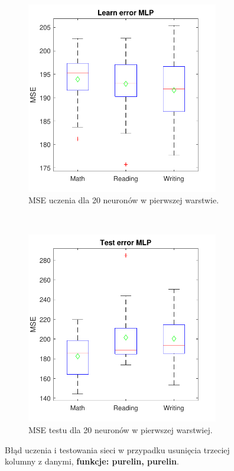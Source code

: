\documentclass[12pt]{article}
\begin{document}
\begin{figure}[H]
\centering
\begin{subfigure}[t]{0.48\textwidth} 
\centering
\includegraphics[height=3.3in]{purelin_purelin_20_without_3_learnBoxplot.pdf}
\caption{MSE uczenia dla  20 neuronów w pierwszej warstwie.}
\end{subfigure}
~~
\begin{subfigure}[t]{0.48\textwidth} 
\centering
\includegraphics[height=3.3in]{purelin_purelin_20_without_3_testBoxplot.pdf}
\caption{MSE testu dla  20  neuronów w pierwszej warstwiej.}
\end{subfigure}

\caption{Błąd uczenia i testowania sieci w przypadku usunięcia trzeciej  kolumny z danymi, \textbf{funkcje: purelin, purelin}.}
\end{figure}

\pagebreak
\end{document}
